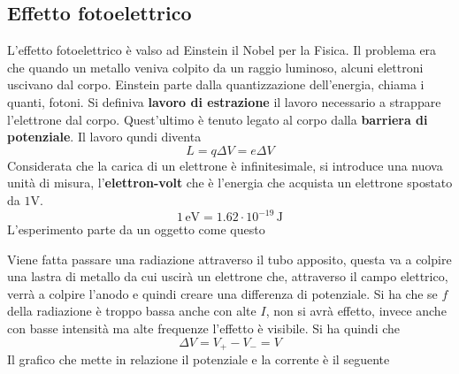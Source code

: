 \subsection{Effetto fotoelettrico}
L'effetto fotoelettrico è valso ad Einstein il Nobel per la Fisica. Il problema era che quando un
metallo veniva colpito da un raggio luminoso, alcuni elettroni uscivano dal corpo. Einstein parte 
dalla quantizzazione dell'energia, chiama i quanti, fotoni. Si definiva \textbf{lavoro di estrazione}
il lavoro necessario a strappare l'elettrone dal corpo. Quest'ultimo è tenuto legato al corpo dalla
\textbf{barriera di potenziale}. Il lavoro qundi diventa
\begin{equation*}
  L = q\Delta V = e\Delta V
\end{equation*}
Considerata che la carica di un elettrone è infinitesimale, si introduce una nuova unità di misura,
l'\textbf{elettron-volt} che è l'energia che acquista un elettrone spostato da $1$V.
\begin{equation*}
  1\,\text{eV} = 1.62\cdot10^{-19}\,\text{J}
\end{equation*}
L'esperimento parte da un oggetto come questo
\begin{center}
\end{center}
Viene fatta passare una radiazione attraverso il tubo apposito, questa va a colpire una lastra di
metallo da cui uscirà un elettrone che, attraverso il campo elettrico, verrà a colpire l'anodo e 
quindi creare una differenza di potenziale. Si ha che se $f$ della radiazione è troppo bassa anche 
con alte $I$, non si avrà effetto, invece anche con basse intensità ma alte frequenze l'effetto è
visibile. Si ha quindi che
\begin{equation*}
  \Delta V = V_+-V_- = V
\end{equation*}
Il grafico che mette in relazione il potenziale e la corrente è il seguente
